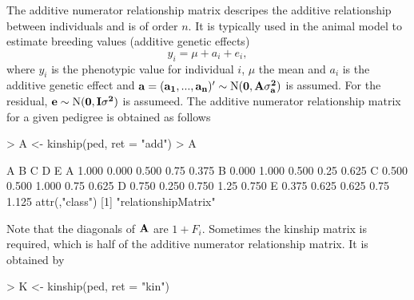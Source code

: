 \documentclass[a4paper,11pt]{article}
\begin{document}
The additive numerator relationship matrix descripes the additive relationship between individuals and is of order $n$. 
It is typically used in the animal model to estimate breeding values (additive genetic effects)
\begin{equation}\label{eq:animalmodel}
 y_i = \mu + a_i + e_i,
\end{equation}                                        
where $y_i$ is the phenotypic value for individual $i$, $\mu$ the mean and $a_i$ is the additive genetic effect and $\bf a = (a_1,...,a_n)' \sim \text{N}(0,\bf{A} \sigma^2_a)$ is assumed.  For the residual,
$\bf e \sim \text{N}(0,\bf I \sigma^2)$ is assumeed. The additive numerator relationship matrix for a given pedigree is obtained as follows
\begin{Schunk}
\begin{Sinput}
> A <- kinship(ped, ret = "add")
> A
\end{Sinput}
\begin{Soutput}
      A     B     C    D     E
A 1.000 0.000 0.500 0.75 0.375
B 0.000 1.000 0.500 0.25 0.625
C 0.500 0.500 1.000 0.75 0.625
D 0.750 0.250 0.750 1.25 0.750
E 0.375 0.625 0.625 0.75 1.125
attr(,"class")
[1] "relationshipMatrix"
\end{Soutput}
\end{Schunk}
Note that the diagonals of $\bf A$ are $1+F_i$. Sometimes the kinship matrix is required, which is half of the additive numerator relationship matrix. It is obtained by
\begin{Schunk}
\begin{Sinput}
> K <- kinship(ped, ret = "kin")
\end{Sinput}
\end{Schunk}
\end{document}
